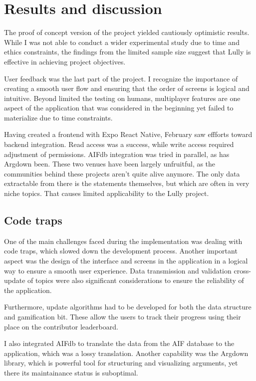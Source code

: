 \documentclass{report}
\begin{document}
\chapter{Results and discussion}

The proof of concept version of the  project yielded cautiously optimistic results. While I was not able to conduct a wider experimental study due to time and ethics constraints, the findings from the limited sample size suggest that Lully is effective in achieving project objectives. 

User feedback was the last part of the project. I recognize the importance of creating a smooth user flow and ensuring that the order of screens is logical and intuitive. Beyond limited the testing on humans, multiplayer features are one aspect of the application that was considered in the beginning yet failed to materialize due to time constraints. 

Having created a frontend with Expo React Native, February saw effforts toward backend integration. Read access was a success, while write access required adjustment of permissions. AIFdb integration was tried in parallel, as has Argdown been. These two venues have been largely unfruitful, as the communities behind these projects aren't quite alive anymore. The only data extractable from there is the statements themselves, but which are often in very niche topics. That causes limited applicability to the Lully project. 

\section{Code traps}
One of the main challenges faced during the implementation was dealing with code traps, which slowed down the development process. Another important aspect was the design of the interface and screens in the application in a logical way to ensure a smooth user experience. Data transmission and validation cross-update of topics were also significant considerations to ensure the reliability of the application.

Furthermore, update algorithms had to be developed for both the data structure and gamification bit. These allow the users to track their progress using their place on the contributor leaderboard. 

I also integrated AIFdb to translate the data from the AIF database to the application, which was a lossy translation.
Another capability was the Argdown library, which is powerful tool for structuring and visualizing arguments, yet there its maintainance status is suboptimal.
\end{document}
